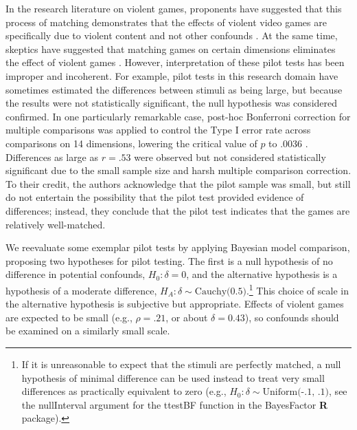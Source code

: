 \documentclass[man]{apa6}
\begin{document}

In the research literature on violent games, proponents have suggested that this process of matching demonstrates that the effects of violent video games are specifically due to violent content and not other confounds \citep{Anderson:etal:2004}. At the same time, skeptics have suggested that matching games on certain dimensions eliminates the effect of violent games \citep{Adachi:Willoughby:2011}. However, interpretation of these pilot tests has been improper and incoherent. For example, pilot tests in this research domain have sometimes estimated the differences between stimuli as being large, but because the results were not statistically significant, the null hypothesis was considered confirmed. In one particularly remarkable case, post-hoc Bonferroni correction for multiple comparisons was applied to control the Type I error rate across comparisons on 14 dimensions, lowering the critical value of $p$ to .0036 \citep{Arriaga:etal:2008}. Differences as large as $r = .53$ were observed but not considered statistically significant due to the small sample size and harsh multiple comparison correction. To their credit, the authors acknowledge that the pilot sample was small, but still do not entertain the possibility that the pilot test provided evidence of differences; instead, they conclude that the pilot test indicates that the games are relatively well-matched.

We reevaluate some exemplar pilot tests by applying Bayesian model comparison, proposing two hypotheses for pilot testing. The first is a null hypothesis of no difference in potential confounds, $H_0: \delta{} = 0$, and the alternative hypothesis is a hypothesis of a moderate difference, $H_A: \delta{} \sim{} \mbox{Cauchy(0.5)}$.\footnote{If it is unreasonable to expect that the stimuli are perfectly matched, a null hypothesis of minimal difference can be used instead to treat very small differences as practically equivalent to zero (e.g., $H_0: \delta{} \sim{} \mbox{Uniform(-.1, .1)}$, see the nullInterval argument for the ttestBF function in the BayesFactor {\bf R} package).} This choice of scale in the alternative hypothesis is subjective but appropriate. Effects of violent games are expected to be small (e.g., $\rho = .21$, or about $\delta = 0.43$), so confounds should be examined on a similarly small scale. 
\end{document}
